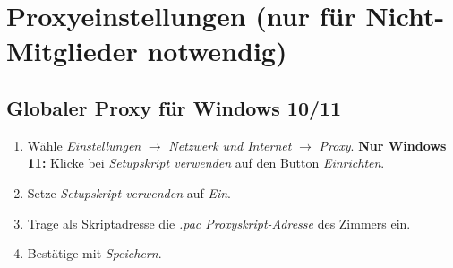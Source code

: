 \documentclass[a4paper,12pt]{scrartcl}
\begin{document}
\section{Proxyeinstellungen (nur für Nicht-Mitglieder notwendig)}
\label{sec:proxy}

\subsection*{Globaler Proxy für Windows 10/11}
\begin{enumerate}
	\item Wähle \textit{Einstellungen} $\rightarrow$ \textit{Netzwerk und Internet} $\rightarrow$ \textit{Proxy}.
	\subitem \textbf{Nur Windows 11:} Klicke bei \textit{Setupskript verwenden} auf den Button  \textit{Einrichten}.
	
	\setcounter{enumi}{1}
	\item Setze \textit{Setupskript verwenden} auf \textit{Ein}.
	\item Trage als Skriptadresse die \textit{.pac Proxyskript-Adresse} des Zimmers ein.
	\item Bestätige mit \textit{Speichern}.
\end{enumerate}
\end{document}
